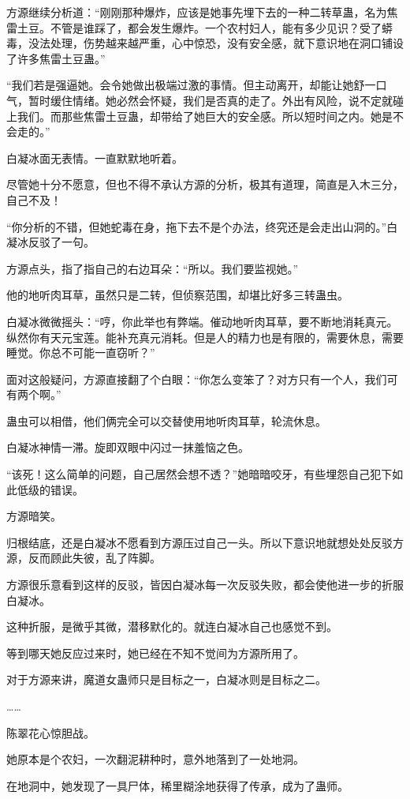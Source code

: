\begin{this_body}
方源继续分析道：“刚刚那种爆炸，应该是她事先埋下去的一种二转草蛊，名为焦雷土豆。不管是谁踩了，都会发生爆炸。一个农村妇人，能有多少见识？受了蟒毒，没法处理，伤势越来越严重，心中惊恐，没有安全感，就下意识地在洞口铺设了许多焦雷土豆蛊。”

“我们若是强逼她。会令她做出极端过激的事情。但主动离开，却能让她舒一口气，暂时缓住情绪。她必然会怀疑，我们是否真的走了。外出有风险，说不定就碰上我们。而那些焦雷土豆蛊，却带给了她巨大的安全感。所以短时间之内。她是不会走的。”

白凝冰面无表情。一直默默地听着。

尽管她十分不愿意，但也不得不承认方源的分析，极其有道理，简直是入木三分，自己不及！

“你分析的不错，但她蛇毒在身，拖下去不是个办法，终究还是会走出山洞的。”白凝冰反驳了一句。

方源点头，指了指自己的右边耳朵：“所以。我们要监视她。”

他的地听肉耳草，虽然只是二转，但侦察范围，却堪比好多三转蛊虫。

白凝冰微微摇头：“哼，你此举也有弊端。催动地听肉耳草，要不断地消耗真元。纵然你有天元宝莲。能补充真元消耗。但是人的精力也是有限的，需要休息，需要睡觉。你总不可能一直窃听？”

面对这般疑问，方源直接翻了个白眼：“你怎么变笨了？对方只有一个人，我们可有两个啊。”

蛊虫可以相借，他们俩完全可以交替使用地听肉耳草，轮流休息。

白凝冰神情一滞。旋即双眼中闪过一抹羞恼之色。

“该死！这么简单的问题，自己居然会想不透？”她暗暗咬牙，有些埋怨自己犯下如此低级的错误。

方源暗笑。

归根结底，还是白凝冰不愿看到方源压过自己一头。所以下意识地就想处处反驳方源，反而顾此失彼，乱了阵脚。

方源很乐意看到这样的反驳，皆因白凝冰每一次反驳失败，都会使他进一步的折服白凝冰。

这种折服，是微乎其微，潜移默化的。就连白凝冰自己也感觉不到。

等到哪天她反应过来时，她已经在不知不觉间为方源所用了。

对于方源来讲，魔道女蛊师只是目标之一，白凝冰则是目标之二。

……

陈翠花心惊胆战。

她原本是个农妇，一次翻泥耕种时，意外地落到了一处地洞。

在地洞中，她发现了一具尸体，稀里糊涂地获得了传承，成为了蛊师。


\end{this_body}
